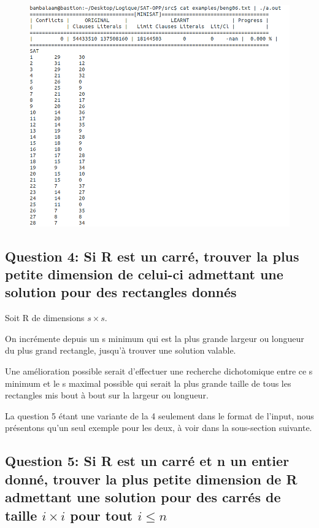 \documentclass[a4paper,10pt]{article}
\begin{document}
\begin{figure}[htb!]
\centering
\includegraphics[scale=0.5]{SAT-BENG06}
\end{figure}

\newpage

\subsection{Question 4: Si R est un carré, trouver la plus petite dimension de celui-ci admettant une solution pour des rectangles donnés}

Soit R de dimensions $s \times s$.

On incrémente depuis un s minimum qui est la plus grande largeur ou longueur du plus grand rectangle, jusqu'à trouver une solution valable.

Une amélioration possible serait d'effectuer une recherche dichotomique entre ce s minimum et le s maximal possible qui serait la plus grande taille de tous les rectangles mis bout à bout sur la largeur ou longueur.

La question 5 étant une variante de la 4 seulement dans le format de l'input, nous présentons qu'un seul exemple pour les deux, à voir dans la sous-section suivante.

\subsection{Question 5: Si R est un carré et n un entier donné, trouver la plus petite dimension de R admettant une solution pour des carrés de taille $i \times i$ pour tout $i \leq n$}
\end{document}
